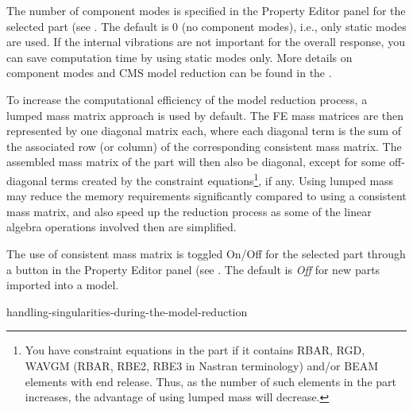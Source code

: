 {The number of component modes is specified in the Property Editor panel
for the selected part (see
.
The default is 0 (no component modes), i.e., only static modes are used.
If the internal vibrations are not important for the overall response,
you can save computation time by using static modes only.
More details on component modes and CMS model reduction can be found in the
.



To increase the computational efficiency of the model reduction process,
a lumped mass matrix approach is used by default. The FE mass matrices are then
represented by one diagonal matrix each, where each diagonal term is the sum of
the associated row (or column) of the corresponding consistent mass matrix.
The assembled mass matrix of the part will then also be diagonal, except for
some off-diagonal terms created by the constraint equations\footnote{
You have constraint equations in the part if it contains RBAR, RGD, WAVGM
(RBAR, RBE2, RBE3 in Nastran terminology) and/or BEAM elements with end release.
Thus, as the number of such elements in the part increases, the advantage of
using lumped mass will decrease.}, if any.
Using lumped mass may reduce the memory requirements significantly compared to
using a consistent mass matrix, and also speed up the reduction process as some
of the linear algebra operations involved then are simplified.


The use of consistent mass matrix is toggled On/Off for the selected part
through a button in the Property Editor panel (see
.
The default is {\sl Off} for new parts imported into a model.


           {handling-singularities-during-the-model-reduction}

}
